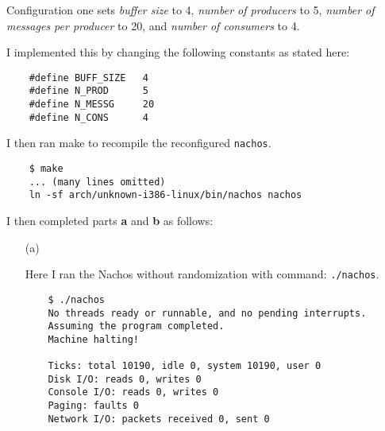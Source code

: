 \documentclass[11pt]{article}
\begin{document}
    \begin{question}
        Configuration one sets {\it buffer size} to 4, {\it number of producers} to 5,  {\it number of messages per producer} to 20, and {\it number of consumers} to 4.

    \begin{subquestion}
        I implemented this by changing the following constants as stated here:
        \begin{verbatim}
    #define BUFF_SIZE   4
    #define N_PROD      5
    #define N_MESSG     20
    #define N_CONS      4
        \end{verbatim}

        I then ran make to recompile the reconfigured {\tt nachos}.
        \begin{verbatim}
    $ make
    ... (many lines omitted)
    ln -sf arch/unknown-i386-linux/bin/nachos nachos
        \end{verbatim}

        I then completed parts {\bf a} and {\bf b} as follows:
        \begin{itemize}
            \item[(a)]{
                Here I ran the Nachos without randomization with command: {\tt ./nachos}.
                \begin{verbatim}
    $ ./nachos
    No threads ready or runnable, and no pending interrupts.
    Assuming the program completed.
    Machine halting!

    Ticks: total 10190, idle 0, system 10190, user 0
    Disk I/O: reads 0, writes 0
    Console I/O: reads 0, writes 0
    Paging: faults 0
    Network I/O: packets received 0, sent 0


\end{verbatim}}
\end{itemize}
\end{subquestion}
\end{question}
\end{document}
